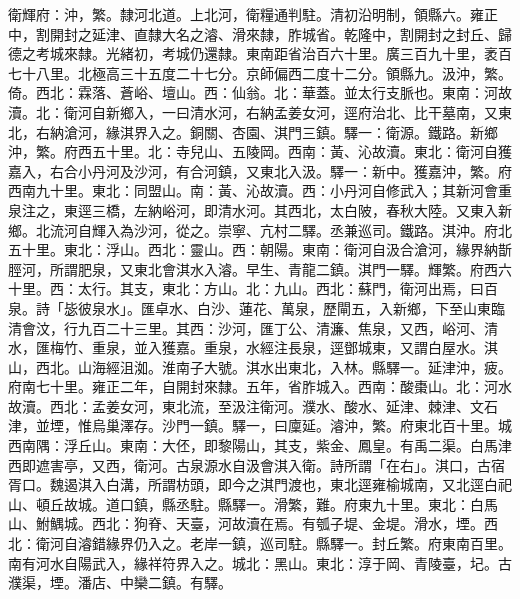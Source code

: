 \begin{pinyinscope}
衛輝府：沖，繁。隸河北道。上北河，衛糧通判駐。清初沿明制，領縣六。雍正中，割開封之延津、直隸大名之濬、滑來隸，胙城省。乾隆中，割開封之封丘、歸德之考城來隸。光緒初，考城仍還隸。東南距省治百六十里。廣三百九十里，袤百七十八里。北極高三十五度二十七分。京師偏西二度十二分。領縣九。汲沖，繁。倚。西北：霖落、蒼峪、壇山。西：仙翁。北：華蓋。並太行支脈也。東南：河故瀆。北：衛河自新鄉入，一曰清水河，右納孟姜女河，逕府治北、比干墓南，又東北，右納滄河，緣淇界入之。銅關、杏園、淇門三鎮。驛一：衛源。鐵路。新鄉沖，繁。府西五十里。北：寺兒山、五陵岡。西南：黃、沁故瀆。東北：衛河自獲嘉入，右合小丹河及沙河，有合河鎮，又東北入汲。驛一：新中。獲嘉沖，繁。府西南九十里。東北：同盟山。南：黃、沁故瀆。西：小丹河自修武入；其新河會重泉注之，東逕三橋，左納峪河，即清水河。其西北，太白陂，春秋大陸。又東入新鄉。北流河自輝入為沙河，從之。崇寧、亢村二驛。丞兼巡司。鐵路。淇沖。府北五十里。東北：浮山。西北：靈山。西：朝陽。東南：衛河自汲合滄河，緣界納斮脛河，所謂肥泉，又東北會淇水入濬。早生、青龍二鎮。淇門一驛。輝繁。府西六十里。西：太行。其支，東北：方山。北：九山。西北：蘇門，衛河出焉，曰百泉。詩「毖彼泉水」。匯卓水、白沙、蓮花、萬泉，歷閘五，入新鄉，下至山東臨清會汶，行九百二十三里。其西：沙河，匯丁公、清濂、焦泉，又西，峪河、清水，匯梅竹、重泉，並入獲嘉。重泉，水經注長泉，逕鄧城東，又謂白屋水。淇山，西北。山海經沮洳。淮南子大號。淇水出東北，入林。縣驛一。延津沖，疲。府南七十里。雍正二年，自開封來隸。五年，省胙城入。西南：酸棗山。北：河水故瀆。西北：孟姜女河，東北流，至汲注衛河。濮水、酸水、延津、棘津、文石津，並堙，惟烏巢澤存。沙門一鎮。驛一，曰廩延。濬沖，繁。府東北百十里。城西南隅：浮丘山。東南：大伾，即黎陽山，其支，紫金、鳳皇。有禹二渠。白馬津西即遮害亭，又西，衛河。古泉源水自汲會淇入衛。詩所謂「在右」。淇口，古宿胥口。魏遏淇入白溝，所謂枋頭，即今之淇門渡也，東北逕雍榆城南，又北逕白祀山、頓丘故城。道口鎮，縣丞駐。縣驛一。滑繁，難。府東九十里。東北：白馬山、鮒鰅城。西北：狗脊、天臺，河故瀆在焉。有瓠子堤、金堤。滑水，堙。西北：衛河自濬錯緣界仍入之。老岸一鎮，巡司駐。縣驛一。封丘繁。府東南百里。南有河水自陽武入，緣祥符界入之。城北：黑山。東北：淳于岡、青陵臺，圮。古濮渠，堙。潘店、中欒二鎮。有驛。


\end{pinyinscope}
